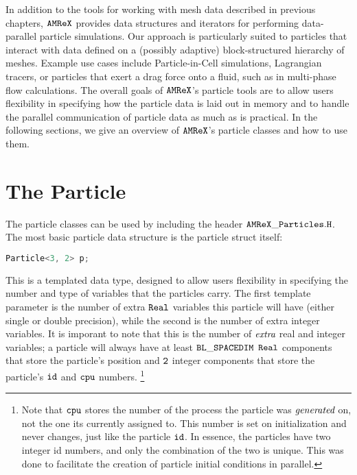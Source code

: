 In addition to the tools for working with mesh data described in previous chapters, $\tt{AMReX}$ provides data structures and iterators for performing data-parallel particle simulations. 
Our approach is particularly suited to particles that interact with data defined on a (possibly adaptive) block-structured hierarchy of meshes. Example use cases include Particle-in-Cell
simulations, Lagrangian tracers, or particles that exert a drag force onto a fluid, such as in multi-phase flow calculations. The overall goals of $\tt{AMReX}$'s particle 
tools are to allow users flexibility in specifying how the particle data is laid out in memory and to handle the parallel communication of particle data as much as is practical.
In the following sections, we give an overview of $\tt{AMReX}$'s particle classes and how to use them.

\section{The Particle}
\label{sec:Particles:Particle}

The particle classes can be used by including the header $\tt{AMReX\_Particles.H}$. The most basic particle data structure is the particle struct itself: 

\begin{lstlisting}[language=cpp]
  Particle<3, 2> p;
\end{lstlisting}

This is a templated data type, designed to allow users flexibility in specifying the number and type of variables that the particles carry. The first template parameter is
the number of extra $\tt{Real}$ variables this particle will have (either single or double precision), while the second is the number of extra integer variables. It is imporant to note
that this is the number of $\emph{extra}$ real and integer variables; a particle will always have at least $\tt{BL\_SPACEDIM}$ $\tt{Real}$ components that store the particle's position
and $\tt{2}$ integer components that store the particle's $\tt{id}$ and $\tt{cpu}$ numbers.
\footnote{Note that $\tt{cpu}$ stores the number of the process the particle was $\emph{generated}$
on, not the one its currently assigned to. This number is set on initialization and never changes, just like the particle $\tt{id}$. In essence, the particles have two integer id numbers, and only the combination of the two is unique. This was done to facilitate the creation of particle initial conditions in parallel.}


